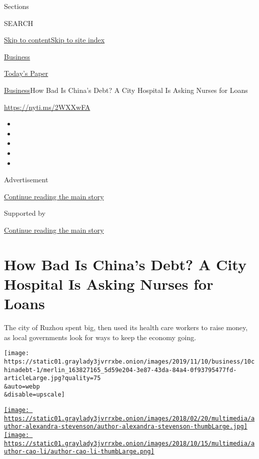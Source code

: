 Sections

SEARCH

\protect\hyperlink{site-content}{Skip to
content}\protect\hyperlink{site-index}{Skip to site index}

\href{https://www.nytimes3xbfgragh.onion/section/business}{Business}

\href{https://myaccount.nytimes3xbfgragh.onion/auth/login?response_type=cookie\&client_id=vi}{}

\href{https://www.nytimes3xbfgragh.onion/section/todayspaper}{Today's
Paper}

\href{/section/business}{Business}\textbar{}How Bad Is China's Debt? A
City Hospital Is Asking Nurses for Loans

\url{https://nyti.ms/2WXXwFA}

\begin{itemize}
\item
\item
\item
\item
\item
\end{itemize}

Advertisement

\protect\hyperlink{after-top}{Continue reading the main story}

Supported by

\protect\hyperlink{after-sponsor}{Continue reading the main story}

\hypertarget{how-bad-is-chinas-debt-a-city-hospital-is-asking-nurses-for-loans}{%
\section{How Bad Is China's Debt? A City Hospital Is Asking Nurses for
Loans}\label{how-bad-is-chinas-debt-a-city-hospital-is-asking-nurses-for-loans}}

The city of Ruzhou spent big, then used its health care workers to raise
money, as local governments look for ways to keep the economy going.

\texttt{[image: https://static01.graylady3jvrrxbe.onion/images/2019/11/10/business/10chinadebt-1/merlin\_163827165\_5d59e204-3e87-43da-84a4-0f93795477fd-articleLarge.jpg?quality=75\\\&auto=webp\\\&disable=upscale]}

\href{https://www.nytimes3xbfgragh.onion/by/alexandra-stevenson}{\texttt{[image: https://static01.graylady3jvrrxbe.onion/images/2018/02/20/multimedia/author-alexandra-stevenson/author-alexandra-stevenson-thumbLarge.jpg]}}\href{https://www.nytimes3xbfgragh.onion/by/cao-li}{\texttt{[image: https://static01.graylady3jvrrxbe.onion/images/2018/10/15/multimedia/author-cao-li/author-cao-li-thumbLarge.png]}}


